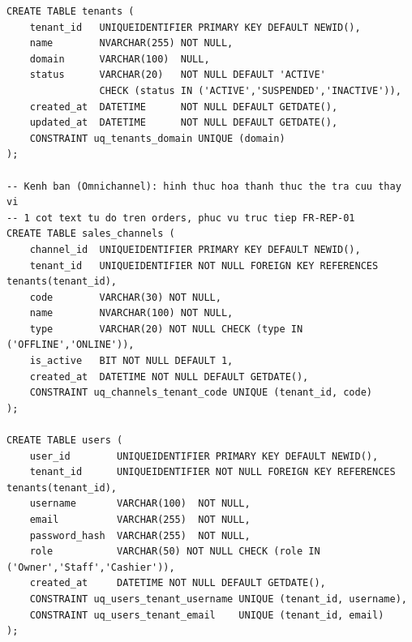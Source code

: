 \begin{lstlisting}
CREATE TABLE tenants (
    tenant_id   UNIQUEIDENTIFIER PRIMARY KEY DEFAULT NEWID(),
    name        NVARCHAR(255) NOT NULL,
    domain      VARCHAR(100)  NULL,
    status      VARCHAR(20)   NOT NULL DEFAULT 'ACTIVE'
                CHECK (status IN ('ACTIVE','SUSPENDED','INACTIVE')),
    created_at  DATETIME      NOT NULL DEFAULT GETDATE(),
    updated_at  DATETIME      NOT NULL DEFAULT GETDATE(),
    CONSTRAINT uq_tenants_domain UNIQUE (domain)
);

-- Kenh ban (Omnichannel): hinh thuc hoa thanh thuc the tra cuu thay vi
-- 1 cot text tu do tren orders, phuc vu truc tiep FR-REP-01
CREATE TABLE sales_channels (
    channel_id  UNIQUEIDENTIFIER PRIMARY KEY DEFAULT NEWID(),
    tenant_id   UNIQUEIDENTIFIER NOT NULL FOREIGN KEY REFERENCES tenants(tenant_id),
    code        VARCHAR(30) NOT NULL,
    name        NVARCHAR(100) NOT NULL,
    type        VARCHAR(20) NOT NULL CHECK (type IN ('OFFLINE','ONLINE')),
    is_active   BIT NOT NULL DEFAULT 1,
    created_at  DATETIME NOT NULL DEFAULT GETDATE(),
    CONSTRAINT uq_channels_tenant_code UNIQUE (tenant_id, code)
);

CREATE TABLE users (
    user_id        UNIQUEIDENTIFIER PRIMARY KEY DEFAULT NEWID(),
    tenant_id      UNIQUEIDENTIFIER NOT NULL FOREIGN KEY REFERENCES tenants(tenant_id),
    username       VARCHAR(100)  NOT NULL,
    email          VARCHAR(255)  NOT NULL,
    password_hash  VARCHAR(255)  NOT NULL,
    role           VARCHAR(50) NOT NULL CHECK (role IN ('Owner','Staff','Cashier')),
    created_at     DATETIME NOT NULL DEFAULT GETDATE(),
    CONSTRAINT uq_users_tenant_username UNIQUE (tenant_id, username),
    CONSTRAINT uq_users_tenant_email    UNIQUE (tenant_id, email)
);
\end{lstlisting}

